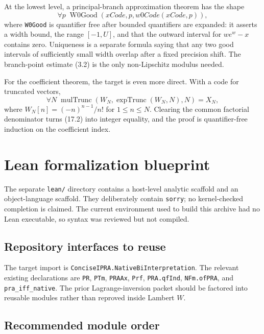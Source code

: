 \documentclass[11pt]{article}
\theoremstyle{definition}
\newcommand{\code}[1]{\nolinkurl{#1}}
\begin{document}
At the lowest level, a principal-branch approximation theorem has the shape
\[
 \forall p\;\operatorname{W0Good}(xCode,p,w0Code(xCode,p)),
 \tag{17.1}
\]
where \code{W0Good} is quantifier free after bounded quantifiers are expanded:
it asserts a width bound, the range \([-1,U]\), and that the outward interval
for \(w e^w-x\) contains zero.  Uniqueness is a separate formula saying that
any two good intervals of sufficiently small width overlap after a fixed
precision shift.  The branch-point estimate (3.2) is the only non-Lipschitz
modulus needed.

For the coefficient theorem, the target is even more direct.  With a code for
truncated vectors,
\[
 \forall N\;\operatorname{mulTrunc}
 (W_N,\operatorname{expTrunc}(W_N,N),N)=X_N,
 \tag{17.2}
\]
where
\(W_N[n]=(-n)^{n-1}/n!\) for \(1\le n\le N\).  Clearing the common factorial
denominator turns (17.2) into integer equality, and the proof is quantifier-free
induction on the coefficient index.

\section{Lean formalization blueprint}\label{sec:lean}

The separate \code{lean/} directory contains a host-level analytic scaffold and
an object-language scaffold.  They deliberately contain \code{sorry}; no
kernel-checked completion is claimed.  The current environment used to build
this archive had no Lean executable, so syntax was reviewed but not compiled.

\subsection{Repository interfaces to reuse}

The target import is
\code{ConciseIPRA.NativeBiInterpretation}.  The relevant existing declarations
are \code{PR}, \code{PTm}, \code{PRAAx}, \code{Prf},
\code{PRA.qfInd}, \code{NFm.ofPRA}, and \code{pra_iff_native}.  The prior
Lagrange-inversion packet should be factored into reusable modules rather than
reproved inside Lambert \(W\).

\subsection{Recommended module order}
\end{document}
